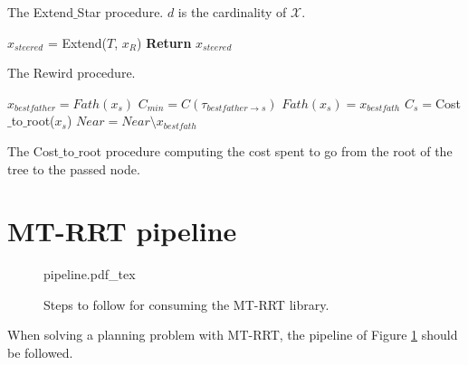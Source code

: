  \begin{algorithm}
 \caption{The Extend$\_$Star procedure.  $d$ is the cardinality of $\mathcal{X}$.
 \label{alg:Expand_star}}
 $x_{steered}$ = Extend($T$, $x_R$)\;
 \textbf{Return} $x_{steered}$\;
 \end{algorithm}

 \begin{algorithm}
 \caption{The Rewird procedure.
 \label{alg:rewird}}
 $x_{best father} = Fath(x_s)$\;
 $C_{min} = C(\tau_{best father \rightarrow s})$\;
 $Fath(x_s) = x_{best fath}$\;
 $C_s=$Cost$\_$to$\_$root($x_s$)\;
 $Near = Near \setminus x_{best fath}$\;
 \end{algorithm}

 \begin{algorithm}
 \caption{The Cost$\_$to$\_$root procedure computing the cost spent to go from the root of the tree to the passed node.
 \label{alg:cost_to_root}}
 \end{algorithm}

\section{MT-RRT pipeline}
\label{sec:pipeline}

 \begin{figure}
	 \centering
 \def\svgwidth{0.9 \columnwidth}
 {pipeline.pdf_tex} 
	 \caption{Steps to follow for consuming the MT-RRT library.}
 \label{fig:pipeline}
 \end{figure}

When solving a planning problem with MT-RRT, the pipeline of Figure \ref{fig:pipeline} should be followed.

